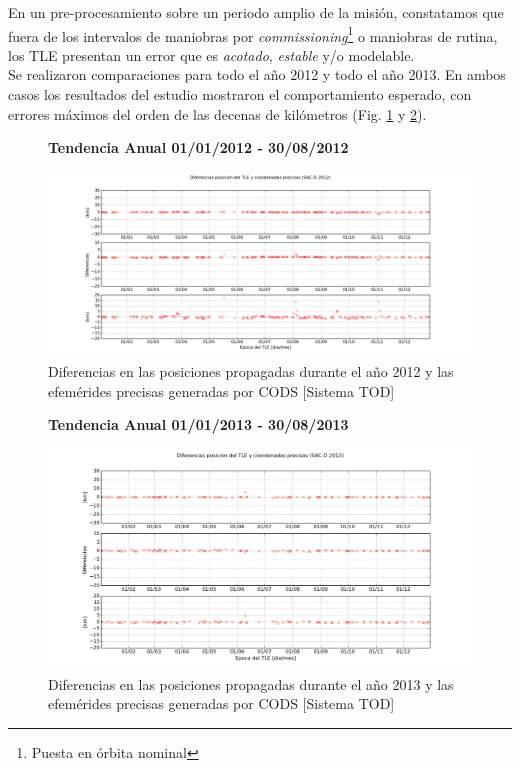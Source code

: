 En un pre-procesamiento sobre un periodo amplio de la misi\'on, constatamos que fuera de los intervalos de maniobras por {\it{commissioning}}\footnote{Puesta en \'orbita nominal} o maniobras de rutina, los TLE presentan un error que es {\it{acotado}}, {\it{estable}} y/o modelable. \\

Se realizaron comparaciones para todo el a\~no 2012 y todo el a\~no 2013. En ambos casos los resultados del estudio mostraron el comportamiento esperado, con errores m\'aximos del orden de las decenas de kil\'ometros (Fig. \ref{fig:sacd2012} y \ref{fig:sacd2013}).\\

\begin{figure}[!h]
\centering
  \textbf{Tendencia Anual 01/01/2012 - 30/08/2012}\par\medskip
  \includegraphics[width=\textwidth]{imagenes/sacDtendencia2012}
  \caption{Diferencias en las posiciones propagadas durante el a\~no 2012 y las efem\'erides precisas generadas por CODS [Sistema TOD]}
  \label{fig:sacd2012}
\end{figure}


\begin{figure}[H]
\centering
  \textbf{Tendencia Anual 01/01/2013 - 30/08/2013}\par\medskip
  \includegraphics[width=\textwidth]{imagenes/sacDtendencia2013}
  \caption{Diferencias en las posiciones propagadas durante el a\~no 2013 y las efem\'erides precisas generadas por CODS [Sistema TOD]}
  \label{fig:sacd2013}
\end{figure}

